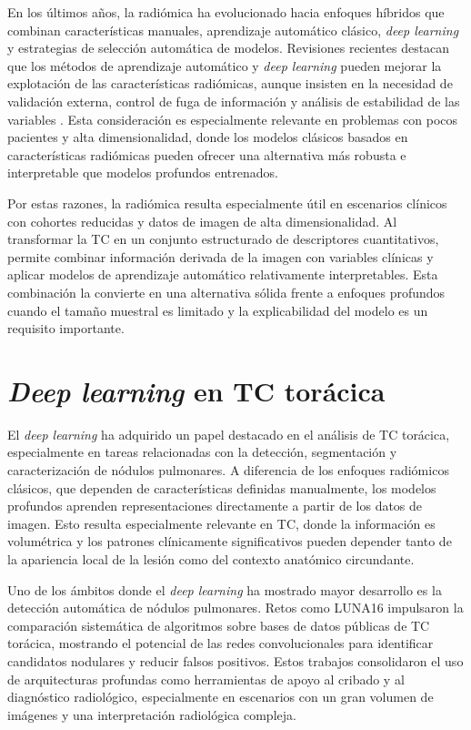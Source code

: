 En los últimos años, la radiómica ha evolucionado hacia enfoques híbridos que combinan características manuales, aprendizaje automático clásico, \textit{deep learning} y estrategias de selección automática de modelos. Revisiones recientes destacan que los métodos de aprendizaje automático y \textit{deep learning} pueden mejorar la explotación de las características radiómicas, aunque insisten en la necesidad de validación externa, control de fuga de información y análisis de estabilidad de las variables \cite{Avanzo2020,Mayerhoefer2020}. Esta consideración es especialmente relevante en problemas con pocos pacientes y alta dimensionalidad, donde los modelos clásicos basados en características radiómicas pueden ofrecer una alternativa más robusta e interpretable que modelos profundos entrenados.

Por estas razones, la radiómica resulta especialmente útil en escenarios clínicos con cohortes reducidas y datos de imagen de alta dimensionalidad. Al transformar la TC en un conjunto estructurado de descriptores cuantitativos, permite combinar información derivada de la imagen con variables clínicas y aplicar modelos de aprendizaje automático relativamente interpretables. Esta combinación la convierte en una alternativa sólida frente a enfoques profundos cuando el tamaño muestral es limitado y la explicabilidad del modelo es un requisito importante.

\section{\textit{Deep learning} en TC torácica}

El \textit{deep learning} ha adquirido un papel destacado en el análisis de TC torácica, especialmente en tareas relacionadas con la detección, segmentación y caracterización de nódulos pulmonares. A diferencia de los enfoques radiómicos clásicos, que dependen de características definidas manualmente, los modelos profundos aprenden representaciones directamente a partir de los datos de imagen. Esto resulta especialmente relevante en TC, donde la información es volumétrica y los patrones clínicamente significativos pueden depender tanto de la apariencia local de la lesión como del contexto anatómico circundante.

Uno de los ámbitos donde el \textit{deep learning} ha mostrado mayor desarrollo es la detección automática de nódulos pulmonares. Retos como LUNA16 \cite{Setio2017} impulsaron la comparación sistemática de algoritmos sobre bases de datos públicas de TC torácica, mostrando el potencial de las redes convolucionales para identificar candidatos nodulares y reducir falsos positivos. Estos trabajos consolidaron el uso de arquitecturas profundas como herramientas de apoyo al cribado y al diagnóstico radiológico, especialmente en escenarios con un gran volumen de imágenes y una interpretación radiológica compleja.

